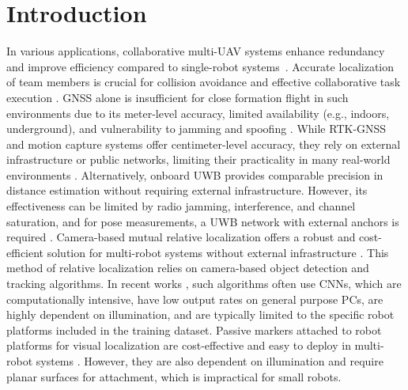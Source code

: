 \documentclass[lettersize,preprint]{elsarticle}
\begin{document}
\section{Introduction}
In various applications, collaborative multi-\gls{UAV} systems enhance redundancy and improve efficiency compared to single-robot systems~\cite{chungSurveyAerialSwarm2018}.
Accurate localization of team members is crucial for collision avoidance and effective collaborative task execution \cite{chungSurveyAerialSwarm2018,chenSurveyRobotSwarms2022}.
\gls{GNSS} alone is insufficient for close formation flight in such environments due to its meter-level accuracy, limited availability (e.g., indoors, underground), and vulnerability to jamming and spoofing \cite{xuDecentralizedVisualInertialUWBFusion2020a, gaoVIDORobustConsistent2023}.
While \gls{RTK}-\gls{GNSS} and motion capture systems offer centimeter-level accuracy, they rely on external infrastructure or public networks, limiting their practicality in many real-world environments \cite{chungSurveyAerialSwarm2018,chenSurveyRobotSwarms2022, wuRealizationRemoteMonitoring2022}.
Alternatively, onboard \gls{UWB} provides comparable precision in distance estimation without requiring external infrastructure.
However, its effectiveness can be limited by radio jamming, interference, and channel saturation, and for pose measurements, a \gls{UWB} network with external anchors is required \cite{xuDecentralizedVisualInertialUWBFusion2020a,jiangIndoorOutdoorSeamless2021, queraltaUWBbasedSystemUAV2020, zhouSwarmMicroFlying2022}.
Camera-based mutual relative localization offers a robust and cost-efficient solution for multi-robot systems without external infrastructure \cite{schillingVisionBasedDroneFlocking2021}. 
This method of relative localization relies on camera-based object detection and tracking algorithms.
In recent works \cite{xuDecentralizedVisualInertialUWBFusion2020a,schillingVisionBasedDroneFlocking2021, ohMarkerBasedLocalizationSystem2023}, such algorithms often use \glspl{CNN}, which are computationally intensive, have low output rates on general purpose PCs, are highly dependent on illumination, and are typically limited to the specific robot platforms included in the training dataset.
Passive markers attached to robot platforms for visual localization are cost-effective and easy to deploy in multi-robot systems \cite{romero-ramirezSpeededDetectionSquared2018a,krajnikExternalLocalizationSystem2013}. 
However, they are also dependent on illumination and require planar surfaces for attachment, which is impractical for small robots.
\end{document}
